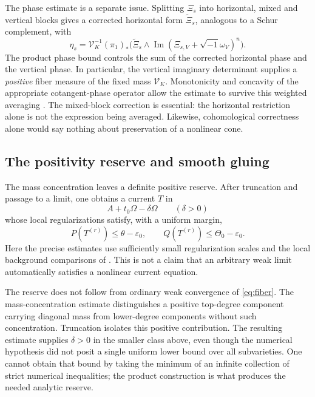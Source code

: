 \documentclass[12pt,reqno]{amsart}
\newcommand{\ii}{\sqrt{-1}}
\newcommand{\Imm}{\operatorname{Im}}
\begin{document}
The phase estimate is a separate issue. Splitting $\Xi_s$ into horizontal, mixed and vertical blocks gives a corrected horizontal form $\widetilde\Xi_s$, analogous to a Schur complement, with
\[
 \eta_s=\mathcal V_K^{-1}(\pi_1)_*
 \bigl(\widetilde\Xi_s\wedge\Imm(\Xi_{s,V}+\ii\omega_V)^n\bigr).
\]
The product phase bound controls the sum of the corrected horizontal phase and the vertical phase. In particular, the vertical imaginary determinant supplies a \emph{positive} fiber measure of the fixed mass $\mathcal V_K$. Monotonicity and concavity of the appropriate cotangent-phase operator allow the estimate to survive this weighted averaging \cite[Lemma 5.2]{CLT}. The mixed-block correction is essential: the horizontal restriction alone is not the expression being averaged. Likewise, cohomological correctness alone would say nothing about preservation of a nonlinear cone.

\subsection{The positivity reserve and smooth gluing}

The mass concentration leaves a definite positive reserve. After truncation and passage to a limit, one obtains a current $T$ in
\[
 A+t_0\Omega-\delta\Omega\qquad(\delta>0)
\]
whose local regularizations satisfy, with a uniform margin,
\begin{equation}\label{eq:current-cone}
 P(T^{(r)})\leq\theta-\varepsilon_0,
 \qquad Q(T^{(r)})\leq\Theta_0-\varepsilon_0.
\end{equation}
Here the precise estimates use sufficiently small regularization scales and the local background comparisons of \cite[Theorem 5.4 and Section 7]{CLT}. This is not a claim that an arbitrary weak limit automatically satisfies a nonlinear current equation.

The reserve does not follow from ordinary weak convergence of \eqref{eq:fiber}. The mass-concentration estimate distinguishes a positive top-degree component carrying diagonal mass from lower-degree components without such concentration. Truncation isolates this positive contribution. The resulting estimate supplies $\delta>0$ in the smaller class above, even though the numerical hypothesis did not posit a single uniform lower bound over all subvarieties. One cannot obtain that bound by taking the minimum of an infinite collection of strict numerical inequalities; the product construction is what produces the needed analytic reserve.
\end{document}
